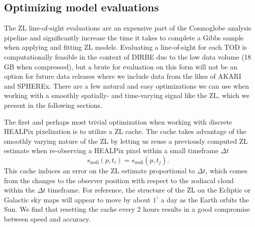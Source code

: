 \documentclass[twocolumn]{aa}
\begin{document}
\subsection{Optimizing model evaluations}\label{sect:optimization}
The ZL line-of-sight evaluations are an expensive part of the Cosmoglobe analysis pipeline and significantly increase the time it takes to complete a Gibbs sample when applying and fitting ZL models. Evaluating a line-of-sight for each TOD is computationally feasible in the context of DIRBE due to the low data volume (18 GB when compressed), but a brute for evaluation on this form will not be an option for future data releases where we include data from the likes of AKARI and SPHEREx. There are a few natural and easy optimizations we can use when working with a smoothly spatially- and time-varying signal like the ZL, which we present in the following sections.

The first and perhaps most trivial optimization when working with discrete HEALPix pixelization is to utilize a ZL cache. The cache takes advantage of the smoothly varying nature of the ZL by letting us reuse a previously computed ZL estimate when re-observing a HEALPix pixel within a small timeframe $\Delta t$
\begin{equation}
 s_\mathrm{zodi}(p, t_i) = s_\mathrm{zodi}(p, t_j).
\end{equation}
This cache induces an error on the ZL estimate proportional to $\Delta t$, which comes from the changes to the observer position with respect to the zodiacal cloud within the $\Delta t$ timeframe. For reference, the structure of the ZL on the Ecliptic or Galactic sky maps will appear to move by about $1^\circ$ a day as the Earth orbits the Sun. We find that resetting the cache every 2 hours results in a good compromise between speed and accuracy.
\end{document}
